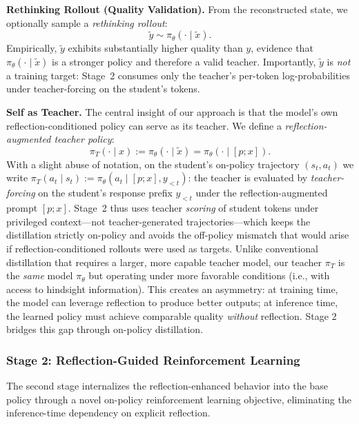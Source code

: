 \documentclass{article}
\theoremstyle{plain}
\theoremstyle{definition}
\theoremstyle{remark}
\begin{document}
\textbf{Rethinking Rollout (Quality Validation).}
From the reconstructed state, we optionally sample a \emph{rethinking rollout}:
\begin{equation}
\tilde{y} \sim \pi_\theta(\cdot\mid\tilde{x}).
\end{equation}
Empirically, $\tilde{y}$ exhibits substantially higher quality than $y$, evidence that $\pi_\theta(\cdot\mid\tilde{x})$ is a stronger policy and therefore a valid teacher.
Importantly, $\tilde{y}$ is \emph{not} a training target: Stage~2 consumes only the teacher's per-token log-probabilities under teacher-forcing on the student's tokens.

\textbf{Self as Teacher.}
The central insight of our approach is that the model's own reflection-conditioned policy can serve as its teacher.
We define a \emph{reflection-augmented teacher policy}:
\begin{equation}
\pi_T(\cdot\mid x) := \pi_\theta(\cdot\mid\tilde{x}) = \pi_\theta(\cdot\mid[p;x]).
\label{eq:teacher}
\end{equation}
With a slight abuse of notation, on the student's on-policy trajectory $(s_t,a_t)$ we write $\pi_T(a_t\mid s_t):=\pi_\theta(a_t\mid [p;x], y_{<t})$: the teacher is evaluated by \emph{teacher-forcing} on the student's response prefix $y_{<t}$ under the reflection-augmented prompt $[p;x]$. Stage~2 thus uses teacher \emph{scoring} of student tokens under privileged context---not teacher-generated trajectories---which keeps the distillation strictly on-policy and avoids the off-policy mismatch that would arise if reflection-conditioned rollouts were used as targets.
Unlike conventional distillation that requires a larger, more capable teacher model, our teacher $\pi_T$ is the \emph{same} model $\pi_\theta$ but operating under more favorable conditions (i.e., with access to hindsight information).
This creates an asymmetry: at training time, the model can leverage reflection to produce better outputs; at inference time, the learned policy must achieve comparable quality \emph{without} reflection.
Stage 2 bridges this gap through on-policy distillation.


\subsubsection{Stage 2: Reflection-Guided Reinforcement Learning}
\label{sec:stage2}

The second stage internalizes the reflection-enhanced behavior into the base policy through a novel on-policy reinforcement learning objective, eliminating the inference-time dependency on explicit reflection.
\end{document}
